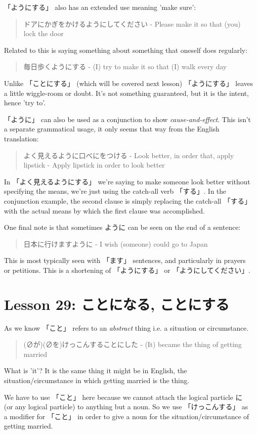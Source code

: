 \documentclass[11pt]{article}
\begin{document}
「ようにする」 also has an extended use meaning 'make sure':
\begin{quote}
ドアにかぎをかけるようにしてください - Please make it so that (you) lock the door
\end{quote}
Related to this is saying something about something that oneself does regularly:
\begin{quote}
毎日歩くようにする - (I) try to make it so that (I) walk every day
\end{quote}
Unlike 「ことにする」 (which will be covered next lesson) 「ようにする」 leaves a little wiggle-room or doubt. It's not something guaranteed, but it is the intent, hence 'try to'.

「ように」 can also be used as a conjunction to show \emph{cause-and-effect}. This isn't a separate grammatical usage, it only seems that way from the English translation:
\begin{quote}
よく見えるように口べにをつける - Look better, in order that, apply lipstick - Apply lipstick in order to look better
\end{quote}
In 「よく見えるようにする」 we're saying to make someone look better without specifying the means, we're just using the catch-all verb 「する」. In the conjunction example, the second clause is simply replacing the catch-all 「する」 with the actual means by which the first clause was accomplished.

One final note is that sometimes ように can be seen on the end of a sentence:
\begin{quote}
日本に行けますように - I wish (someone) could go to Japan
\end{quote}
This is most typically seen with 「ます」 sentences, and particularly in prayers or petitions. This is a shortening of 「ようにする」 or 「ようにしてください」.
\section{Lesson 29: ことになる, ことにする}
\label{sec:org322281a}
As we know 「こと」 refers to an \emph{abstract} thing i.e. a situation or circumstance.
\begin{quote}
(∅が)(∅を)けっこんすることにした - (It) became the thing of getting married
\end{quote}
What is 'it'? It is the same thing it might be in English, the situation/circumstance in which getting married is the thing.

We have to use 「こと」 here because we cannot attach the logical particle に (or any logical particle) to anything but a noun. So we use 「けっこんする」 as a modifier for 「こと」 in order to give a noun for the situation/circumstance of getting married.
\end{document}
